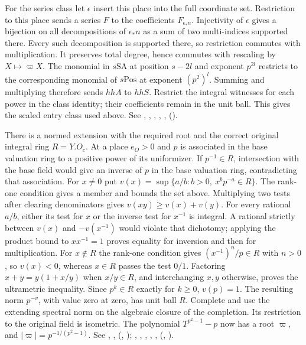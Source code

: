 For the series class let $\epsilon$ insert this place into the full
coordinate set. Restriction to this place sends a series $F$ to
the coefficients $F_{\epsilon_*n}$. Injectivity of $\epsilon$ gives
a bijection on all decompositions of $\epsilon_*n$ as a sum of two
multi-indices supported there. Every such decomposition is supported
there, so restriction commutes with multiplication. It preserves
total degree, hence commutes with rescaling by $X\mapsto\varpi X$.
The monomial in $s\mathrm{SA}$ at position $s-2l$ and exponent
$p^{2l}$ restricts to the corresponding monomial of $s\mathrm{Pos}$
at exponent $(p^2)^l$. Summing and multiplying therefore sends
$hhA$ to $hhS$. Restrict the integral witnesses for each power in
the class identity; their coefficients remain in the unit ball.
This gives the scaled entry class used above.
See , , ,
, , 
().

There is a normed extension with the required root and the correct
original integral ring $R=Y.O_c$. At a place $e_O>0$ and $p$ is
associated in the base valuation ring to a positive power of its
uniformizer. If $p^{-1}\in R$, intersection with the base field
would give an inverse of $p$ in the base valuation ring, contradicting
that association. For $x\ne0$ put
$v(x)=\sup\{a/b:b>0,\ x^bp^{-a}\in R\}$.
The rank-one condition gives a member and bounds the set above. Multiplying
two tests after clearing denominators gives $v(xy)\ge v(x)+v(y)$.
For every rational $a/b$, either its test for $x$ or the inverse
test for $x^{-1}$ is integral. A rational strictly between $v(x)$
and $-v(x^{-1})$ would violate that dichotomy; applying the product
bound to $xx^{-1}=1$ proves equality for inversion and then for
multiplication. For $x\notin R$ the rank-one condition gives
$(x^{-1})^n/p\in R$ with $n>0$, so $v(x)<0$, whereas $x\in R$
passes the test $0/1$. Factoring $x+y=y(1+x/y)$ when $x/y\in R$,
and interchanging $x,y$ otherwise, proves the ultrametric inequality.
Since $p^k\in R$ exactly for $k\ge0$, $v(p)=1$. The resulting
norm $p^{-v}$, with value zero at zero, has unit ball $R$. Complete
and use the extending spectral norm on the algebraic closure of the
completion. Its restriction to the original field is isometric.
The polynomial $T^{p^2-1}-p$ now has a root $\varpi$, and
$|\varpi|=p^{-1/(p^2-1)}$. See , ,
(,
);
, , , ,
, 
(,
).

